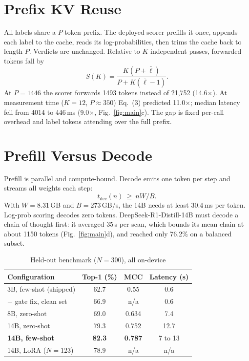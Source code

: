 \documentclass[conference,10pt]{IEEEtran}
\begin{document}
\section{Prefix KV Reuse}
All labels share a $P$-token prefix. The deployed scorer prefills it once, appends each label to the cache, reads its log-probabilities, then trims the cache back to length $P$. Verdicts are unchanged. Relative to $K$ independent passes, forwarded tokens fall by
\begin{equation}
S(K)=\frac{K(P+\bar\ell)}{P+K(\bar\ell-1)} .
\end{equation}
At $P{=}1446$ the scorer forwards 1493 tokens instead of 21{,}752 (14.6$\times$). At measurement time ($K{=}12$, $P{\approx}350$) Eq.~(3) predicted 11.0$\times$; median latency fell from 4014 to 446\,ms (9.0$\times$, Fig.~\ref{fig:main}c). The gap is fixed per-call overhead and label tokens attending over the full prefix.

\section{Prefill Versus Decode}
Prefill is parallel and compute-bound. Decode emits one token per step and streams all weights each step:
\begin{equation}
t_{\mathrm{dec}}(n)\ \ge\ nW/B .
\end{equation}
With $W{=}8.31$\,GB and $B{=}273$\,GB/s, the 14B needs at least 30.4\,ms per token. Log-prob scoring decodes zero tokens. DeepSeek-R1-Distill-14B \cite{r1} must decode a chain of thought first: it averaged 35\,s per scan, which bounds its mean chain at about 1150 tokens (Fig.~\ref{fig:main}d), and reached only 76.2\% on a balanced subset.

\begin{table}[!b]
\centering\footnotesize
\caption{Held-out benchmark ($N{=}300$), all on-device}
\label{tab:res}
\vspace{-4pt}
\begin{tabular}{@{}lccc@{}}
\toprule
Configuration & Top-1 (\%) & MCC & Latency (s)\\
\midrule
3B, few-shot (shipped) & 62.7 & 0.55 & 0.6\\
\quad + gate fix, clean set & 66.9 & n/a & 0.6\\
8B, zero-shot & 69.0 & 0.634 & 7.4\\
14B, zero-shot & 79.3 & 0.752 & 12.7\\
\textbf{14B, few-shot} & \textbf{82.3} & \textbf{0.787} & 7 to 13\\
14B, LoRA ($N{=}123$) & 78.9 & n/a & n/a\\
\bottomrule
\end{tabular}
\end{table}
\end{document}
